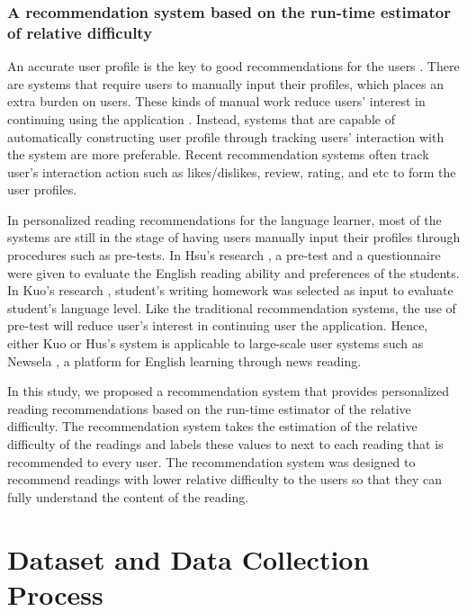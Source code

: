 \subsection{A recommendation system based on the run-time estimator of relative difficulty}

An accurate user profile is the key to good recommendations for the users \cite{Tan1998}. There are systems \cite{Klausmeier1977, Kuo2014} that require users to manually input their profiles, which places an extra burden on users. These kinds of manual work reduce users' interest in continuing using the application \cite{Tan1998}. Instead, systems that are capable of automatically constructing user profile through tracking users' interaction with the system are more preferable. Recent recommendation systems often track user's interaction action such as likes/dislikes, review, rating, and etc to form the user profiles. 

In personalized reading recommendations for the language learner, most of the systems \cite{Hwang2010, Kuo2014} are still in the stage of having users manually input their profiles through procedures such as pre-tests. In Hsu's research \cite{Hwang2010}, a pre-test and a questionnaire were given to evaluate the English reading ability and preferences of the students. In Kuo's research \cite{Kuo2014}, student's writing homework was selected as input to evaluate student's language level. Like the traditional recommendation systems, the use of pre-test will reduce user's interest in continuing user the application. Hence, either Kuo or Hus's system is applicable to large-scale user systems such as Newsela \cite{Newsela}, a platform for English learning through news reading.

In this study, we proposed a recommendation system that provides personalized reading recommendations based on the run-time estimator of the relative difficulty. The recommendation system takes the estimation of the relative difficulty of the readings and labels these values to next to each reading that is recommended to every user. The recommendation system was designed to recommend readings with lower relative difficulty to the users so that they can fully understand the content of the reading.


\chapter{Dataset and Data Collection Process}

